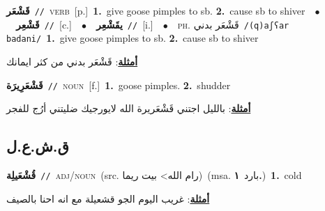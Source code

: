 \documentclass[10pt,a4paper,twoside]{article} %
\begin{document}
\begin{multicols}{2}
{\setlength\topsep{0pt}\textbf{\foreignlanguage{arabic}{قَشْعَر}}\ {\color{gray}\texttt{//}\color{black}}\ \textsc{verb}\ [p.]\ \textbf{1.}~give goose pimples to sb.  \textbf{2.}~cause sb to shiver\ \ $\bullet$\ \ \setlength\topsep{0pt}\textbf{\foreignlanguage{arabic}{قَشْعِر}}\ {\color{gray}\texttt{//}\color{black}}\ [c.]\ \ $\bullet$\ \ \setlength\topsep{0pt}\textbf{\foreignlanguage{arabic}{يقَشْعِر}}\ {\color{gray}\texttt{//}\color{black}}\ [i.]\ \ $\bullet$\ \ \textsc{ph.} \color{gray} \foreignlanguage{arabic}{قَشْعَر بدني}\color{black}\ {\color{gray}\texttt{/{\sffamily (q)aʃʕar badani}/}\color{black}}\ \textbf{1.}~give goose pimples to sb.  \textbf{2.}~cause sb to shiver\  \begin{flushright}\color{gray}\foreignlanguage{arabic}{\textbf{\underline{\foreignlanguage{arabic}{أمثلة}}}: قَشْعَر بدني من كثر ايمانك}\end{flushright}\color{black}} \vspace{2mm}

{\setlength\topsep{0pt}\textbf{\foreignlanguage{arabic}{قَشْعَرِيرَة}}\ {\color{gray}\texttt{//}\color{black}}\ \textsc{noun}\ [f.]\ \textbf{1.}~goose pimples.  \textbf{2.}~shudder\  \begin{flushright}\color{gray}\foreignlanguage{arabic}{\textbf{\underline{\foreignlanguage{arabic}{أمثلة}}}: بالليل اجتني قَشْعَريرة الله لايورجيك ضليتني أرُج للفجر}\end{flushright}\color{black}} \vspace{2mm}

\vspace{-3mm}
\subsection*{\color{blue}\foreignlanguage{arabic}{ق.ش.ع.ل}\color{blue}{}} 

{\setlength\topsep{0pt}\textbf{\foreignlanguage{arabic}{قُشْعَيلِة}}\ {\color{gray}\texttt{//}\color{black}}\ \textsc{adj/noun}\ (src. \color{gray}\foreignlanguage{arabic}{رام الله> بيت ريما}\color{black})\ \color{gray}(msa. \foreignlanguage{arabic}{بارد}~\foreignlanguage{arabic}{\textbf{١.}})\color{black}\ \textbf{1.}~cold\  \begin{flushright}\color{gray}\foreignlanguage{arabic}{\textbf{\underline{\foreignlanguage{arabic}{أمثلة}}}: غريب اليوم الجو قشعيلة مع انه احنا بالصيف}\end{flushright}\color{black}} \vspace{2mm}


\end{multicols}
\end{document}
